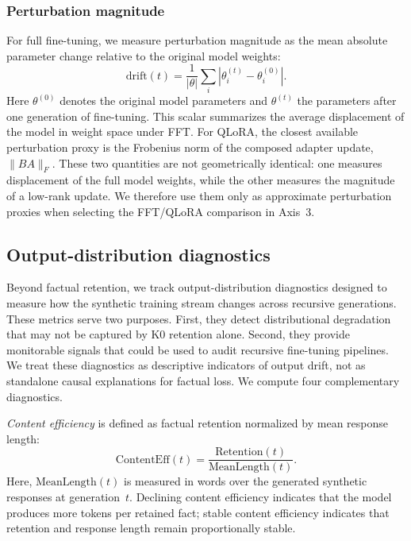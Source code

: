 \documentclass[a4paper,fleqn]{cas-dc}
\begin{document}
\subsubsection{Perturbation magnitude}\label{sec:pertmag}
For full fine-tuning, we measure perturbation magnitude as the mean absolute
parameter change relative to the original model weights:
\begin{equation}\label{eq:drift}
    \mathrm{drift}(t) =
    \frac{1}{|\theta|}\sum_i |\theta^{(t)}_i - \theta^{(0)}_i|.
\end{equation}
Here $\theta^{(0)}$ denotes the original model parameters and $\theta^{(t)}$
the parameters after one generation of fine-tuning. This scalar summarizes the
average displacement of the model in weight space under FFT. For QLoRA, the
closest available perturbation proxy is the Frobenius norm of the composed
adapter update, $\|BA\|_F$. These two quantities are not geometrically identical:
one measures displacement of the full model weights, while the other measures
the magnitude of a low-rank update. We therefore use them only as approximate
perturbation proxies when selecting the FFT/QLoRA comparison in Axis~3.

\subsection{Output-distribution diagnostics}\label{sec:metrics}

Beyond factual retention, we track output-distribution diagnostics designed to
measure how the synthetic training stream changes across recursive generations.
These metrics serve two purposes. First, they detect distributional degradation
that may not be captured by K0 retention alone. Second, they provide monitorable
signals that could be used to audit recursive fine-tuning pipelines. We treat
these diagnostics as descriptive indicators of output drift, not as standalone
causal explanations for factual loss. We compute four complementary diagnostics.

\textit{Content efficiency} is defined as factual retention normalized by mean
response length:
\begin{equation}\label{eq:efficiency}
    \mathrm{ContentEff}(t) =
    \frac{\mathrm{Retention}(t)}{\mathrm{MeanLength}(t)}.
\end{equation}
Here, $\mathrm{MeanLength}(t)$ is measured in words over the generated synthetic
responses at generation~$t$. Declining content efficiency indicates that the
model produces more tokens per retained fact; stable content efficiency indicates
that retention and response length remain proportionally stable.
\end{document}
